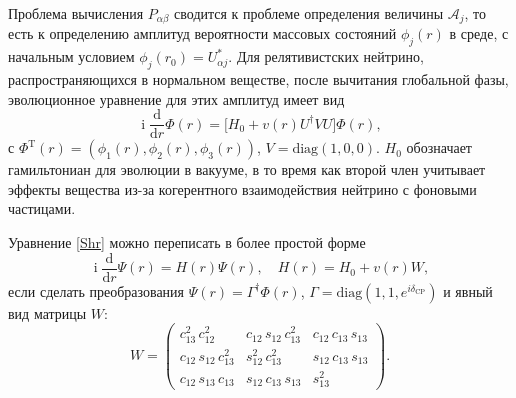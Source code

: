 \documentclass[12pt]{article}
\DeclareMathOperator\Iunit{i}
\renewcommand\imath\Iunit
\begin{document}
Проблема вычисления $P_{\alpha\beta}$ сводится к проблеме определения величины
$\mathcal{A}_j$, то есть к определению амплитуд вероятности массовых состояний
$\phi_j(r)$ в среде, с начальным условием $\phi_j(r_0)=U^*_{\alpha j}$. Для
релятивистских нейтрино, распространяющихся в нормальном веществе, после
вычитания глобальной фазы, эволюционное уравнение для этих амплитуд имеет вид
\begin{equation}\label{Shr}
  \imath\frac{\text{d}}{\text{d}r} \Phi(r)=
  \big[H_0+v(r)U^\dagger V U\big] \Phi(r),
\end{equation}
с $\Phi^{\text{T}}(r)=(\phi_1(r),\phi_2(r),\phi_3(r))$, $V=\text{diag}(1,0,0)$.
$H_0$ обозначает гамильтониан для эволюции в вакууме, в то время как второй член
учитывает эффекты вещества из-за когерентного взаимодействия нейтрино с фоновыми
частицами.

Уравнение \eqref{Shr} можно переписать в более простой форме
\begin{equation}\label{eq:1}
  \imath\frac{\text{d}}{\text{d}r}\Psi(r)=H(r)\Psi(r),\quad
  H(r)=H_0 + v(r)W,
\end{equation}
если сделать преобразования $\Psi(r)=\Gamma^\dagger\Phi(r)$,
$\Gamma=\text{diag}(1,1,e^{i\delta_{\text{CP}}})$ и явный вид матрицы $W$:
\begin{equation}\label{W}
  W=
  \begin{pmatrix}
    c^2_{13}\, c^2_{12}& c_{12}\, s_{12}\, c^2_{13}& c_{12}\, c_{13}\, s_{13}\\
    c_{12}\, s_{12}\, c^2_{13}& s^2_{12}\, c^2_{13}& s_{12}\, c_{13}\, s_{13}\\
    c_{12}\, s_{13}\, c_{13}& s_{12}\, c_{13}\, s_{13}& s^2_{13}
  \end{pmatrix}.
\end{equation}
\end{document}
